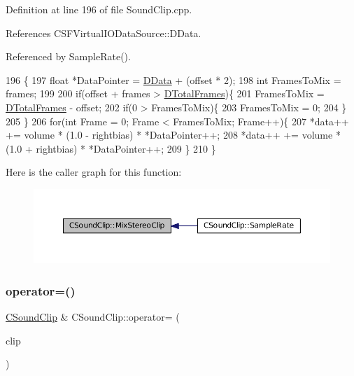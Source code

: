 Definition at line 196 of file Sound\+Clip.\+cpp.



References C\+S\+F\+Virtual\+I\+O\+Data\+Source\+::\+D\+Data.



Referenced by Sample\+Rate().


\begin{DoxyCode}
196                                                                                                 \{
197     \textcolor{keywordtype}{float} *DataPointer = \hyperlink{classCSoundClip_a220921a0c81e5c63e2cd3c55c75878b1}{DData} + (offset * 2);
198     \textcolor{keywordtype}{int} FramesToMix = frames;
199     
200     \textcolor{keywordflow}{if}(offset + frames > \hyperlink{classCSoundClip_ab0d9eb261d09fa2a106658276f37285b}{DTotalFrames})\{
201         FramesToMix = \hyperlink{classCSoundClip_ab0d9eb261d09fa2a106658276f37285b}{DTotalFrames} - offset;
202         \textcolor{keywordflow}{if}(0 > FramesToMix)\{
203             FramesToMix = 0;
204         \}
205     \}
206     \textcolor{keywordflow}{for}(\textcolor{keywordtype}{int} Frame = 0; Frame < FramesToMix; Frame++)\{
207         *data++ += volume * (1.0 - rightbias) * *DataPointer++;
208         *data++ += volume * (1.0 + rightbias) * *DataPointer++;
209     \}
210 \}
\end{DoxyCode}
Here is the caller graph for this function\+:\nopagebreak
\begin{figure}[H]
\begin{center}
\leavevmode
\includegraphics[width=350pt]{classCSoundClip_a54fb05ee6936503af55650b10c861967_icgraph}
\end{center}
\end{figure}
\hypertarget{classCSoundClip_a4ab9ebe61c3b5ee9545e1167e53faeb3}{}\label{classCSoundClip_a4ab9ebe61c3b5ee9545e1167e53faeb3} 
\subsubsection{\texorpdfstring{operator=()}{operator=()}}
{\footnotesize\ttfamily \hyperlink{classCSoundClip}{C\+Sound\+Clip} \& C\+Sound\+Clip\+::operator= (\begin{DoxyParamCaption}\item[{const \hyperlink{classCSoundClip}{C\+Sound\+Clip} \&}]{clip }\end{DoxyParamCaption})}



